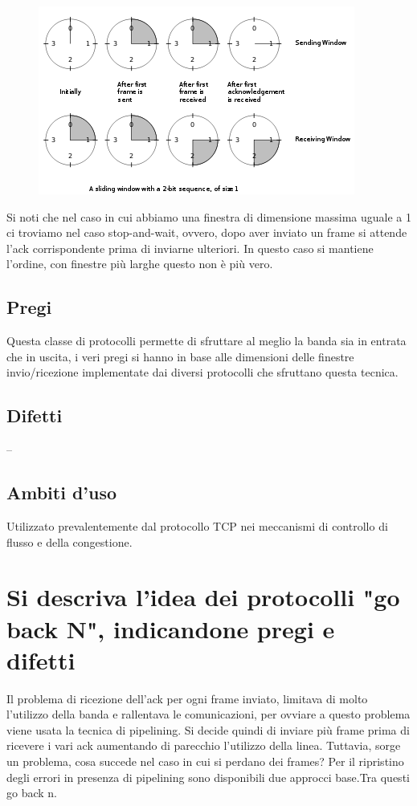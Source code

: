 \begin{figure}[H]
\centering
\includegraphics[scale=1]{res/img/19_SlidingWindow.png}
\end{figure}
 
Si noti che nel caso in cui abbiamo una finestra di dimensione massima uguale a 1 ci troviamo nel caso stop-and-wait, ovvero,
dopo aver inviato un frame si attende l'ack corrispondente prima di inviarne ulteriori.
In questo caso si mantiene l'ordine, con finestre più larghe questo non è più vero.

\subsection{Pregi}
Questa classe di protocolli permette di sfruttare al meglio la banda sia in entrata che in uscita, i veri pregi si hanno in base alle dimensioni delle finestre invio/ricezione implementate dai diversi protocolli che sfruttano questa tecnica.

\subsection{Difetti}
--

\subsection{Ambiti d'uso}
Utilizzato prevalentemente dal protocollo TCP nei meccanismi di controllo di flusso e della congestione.

\section{Si descriva l'idea dei protocolli "go back N", indicandone pregi e difetti}

Il problema di ricezione dell'ack per ogni frame inviato, limitava di molto l'utilizzo della banda e rallentava le comunicazioni, per ovviare a questo problema viene usata la tecnica di pipelining. Si decide quindi di inviare più frame prima di ricevere i vari ack aumentando di parecchio l'utilizzo della linea. Tuttavia, sorge un problema, cosa succede nel caso in cui si perdano dei frames? Per il ripristino degli errori in presenza di pipelining sono disponibili due approcci base.Tra questi go back n.
